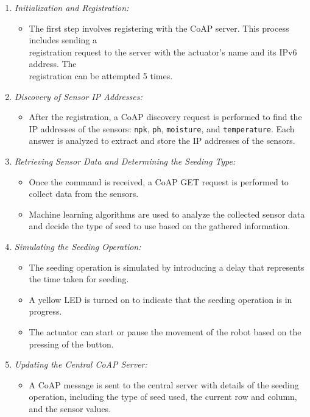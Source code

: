 \begin{enumerate}
    \item \textit{Initialization and Registration:}
    \begin{itemize}
        \item The first step involves registering with the CoAP server. This process includes sending a\\
         registration request to the server with the actuator's name and its IPv6 address. The\\
         registration can be attempted 5 times.
    \end{itemize}
    
    \item \textit{Discovery of Sensor IP Addresses:}
    \begin{itemize}
        \item After the registration, a CoAP discovery request is performed to find the IP addresses of the sensors: \texttt{npk}, \texttt{ph}, \texttt{moisture}, and \texttt{temperature}. Each answer is analyzed to extract and store the IP addresses of the sensors.
    \end{itemize}
    
    \item \textit{Retrieving Sensor Data and Determining the Seeding Type:}
    \begin{itemize}
        \item Once the command is received, a CoAP GET request is performed to collect data from the sensors.
        \item Machine learning algorithms are used to analyze the collected sensor data and decide the type of seed to use based on the gathered information.
    \end{itemize}
    
    \item \textit{Simulating the Seeding Operation:}
    \begin{itemize}
        \item The seeding operation is simulated by introducing a delay that represents the time taken for seeding.
        \item A yellow LED is turned on to indicate that the seeding operation is in progress.
        \item The actuator can start or pause the movement of the robot based on the pressing of the button.
    \end{itemize}
    
    \item \textit{Updating the Central CoAP Server:}
    \begin{itemize}
        \item A CoAP message is sent to the central server with details of the seeding operation, including the type of seed used, the current row and column, and the sensor values.
    \end{itemize}
    

\end{enumerate}
